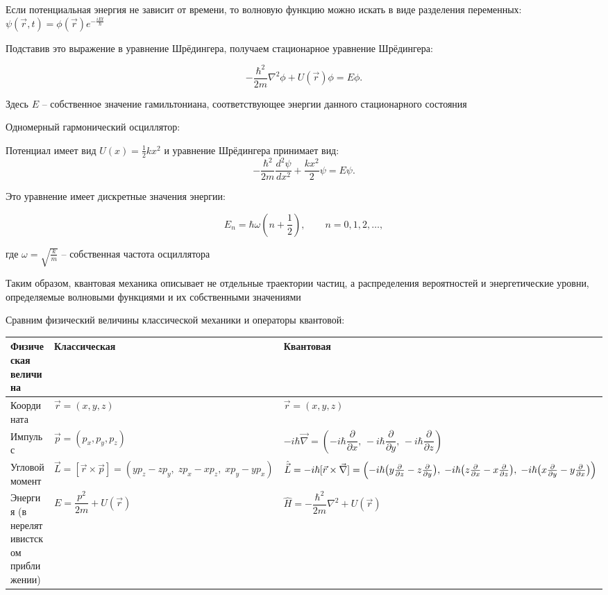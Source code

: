 \mediumvspace

Если потенциальная энергия не зависит от времени, то волновую функцию можно искать в виде разделения переменных: $\psi(\vec r, t) = \phi(\vec r)e^{-\frac{iEt}{\hbar}}$

Подставив это выражение в уравнение Шрёдингера, получаем стационарное уравнение Шрёдингера:

\[
-\frac{\hbar^2}{2m}\nabla^2 \phi + U(\vec r)\phi = E\phi.
\]

Здесь $E$ -- собственное значение гамильтониана, соответствующее энергии данного стационарного состояния

\mediumvspace

\Ex Одномерный гармонический осциллятор:

Потенциал имеет вид $U(x) = \frac{1}{2}kx^2$ и уравнение Шрёдингера принимает вид:
\[
-\frac{\hbar^2}{2m}\frac{d^2\psi}{dx^2} + \frac{kx^2}{2}\psi = E\psi.
\]

Это уравнение имеет дискретные значения энергии:

\[
E_n = \hbar\omega\left(n + \frac{1}{2}\right), \qquad n = 0, 1, 2, \ldots,
\]

где $\omega = \sqrt{\frac{k}{m}}$ -- собственная частота осциллятора

\mediumvspace

Таким образом, квантовая механика описывает не отдельные траектории частиц, а распределения вероятностей и энергетические уровни, определяемые волновыми функциями и их собственными значениями

Сравним физический величины классической механики и операторы квантовой:

\begin{center}
    \begin{tabularx}{\textwidth}{p{}|X|X}
        Физическая величина & Классическая & Квантовая \\
        \hline
        Координата & $\vec{r} = (x, y, z)$ & $\vec{r} = (x, y, z)$ \\
        \hline
        Импульс & $\vec{p} = (p_x, p_y, p_z)$ & $-i\hbar\vec{\nabla} = \left(-i\hbar\dfrac{\partial}{\partial x},\, -i\hbar\dfrac{\partial}{\partial y},\, -i\hbar\dfrac{\partial}{\partial z}\right)$ \\
        \hline
        Угловой момент &
        $\vec{L} = [\vec{r} \times \vec{p}] = (yp_z - zp_y,\; zp_x - xp_z,\; xp_y - yp_x)$ &
        $\hat{\vec{L}} = -i\hbar[\vec{r} \times \vec{\nabla}] =
        \Bigl(
          -i\hbar\bigl(y\tfrac{\partial}{\partial z} - z\tfrac{\partial}{\partial y}\bigr),\;
          -i\hbar\bigl(z\tfrac{\partial}{\partial x} - x\tfrac{\partial}{\partial z}\bigr),\;
          -i\hbar\bigl(x\tfrac{\partial}{\partial y} - y\tfrac{\partial}{\partial x}\bigr)
        \Bigr)$ \\
        \hline
        Энергия (в нерелятивистском приближении) &
        $E = \dfrac{p^2}{2m} + U(\vec{r})$ &
        $\hat{H} = -\dfrac{\hbar^2}{2m}\nabla^2 + U(\vec{r})$ \\
    \end{tabularx}
\end{center}


